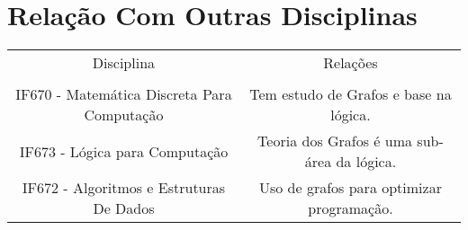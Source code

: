 \documentclass{article}
\begin{document}
\section{Relação Com Outras Disciplinas}
\begin{tabular}{c|c}
  Disciplina   &  Relações \\
   & \\
  IF670 - Matemática Discreta Para Computação  & Tem estudo de Grafos e base na lógica. \\
  IF673 - Lógica para Computação & Teoria dos Grafos é uma sub-área da lógica. \\
  IF672 - Algoritmos e Estruturas De Dados & Uso de grafos para optimizar programação.	
\end{tabular}



\end{document}
